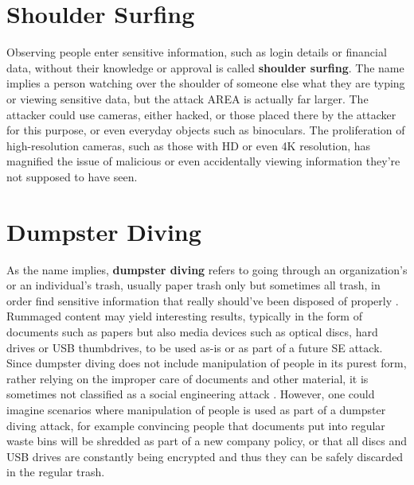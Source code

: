 
\section{Shoulder Surfing}

Observing people enter sensitive information, such as login details or financial data, without their knowledge or approval is called \textbf{shoulder surfing}. The name implies a person watching over the shoulder of someone else what they are typing or viewing sensitive data, but the attack AREA is actually far larger. The attacker could use cameras, either hacked, or those placed there by the attacker for this purpose, or even everyday objects such as binoculars. The proliferation of high-resolution cameras, such as those with HD or even 4K resolution, has magnified the issue of malicious or even accidentally viewing information they're not supposed to have seen.









\section{Dumpster Diving}

As the name implies, \textbf{dumpster diving} refers to going through an organization's or an individual's trash, usually paper trash only but sometimes all trash, in order find sensitive information that really should've been disposed of properly \citep{syafitri_social_2022}. Rummaged content may yield interesting results, typically in the form of documents such as papers but also media devices such as optical discs, hard drives or USB thumbdrives, to be used as-is or as part of a future SE attack. Since dumpster diving does not include manipulation of people in its purest form, rather relying on the improper care of documents and other material, it is sometimes not classified as a social engineering attack \citep{wang_defining_2020}. However, one could imagine scenarios where manipulation of people is used as part of a dumpster diving attack, for example convincing people that documents put into regular waste bins will be shredded as part of a new company policy, or that all discs and USB drives are constantly being encrypted and thus they can be safely discarded in the regular trash.









